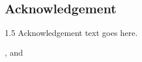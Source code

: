 \begin{center}
  \section*{Acknowledgement}
\end{center}


\begin{spacing}{1.5}
Acknowledgement text goes here.
\end{spacing}

\begin{flushright}
  {\firststudentname}, {\secondstudentname} and {\thirdstudentname}
\end{flushright}

\clearpage
\vspace*{2cm}
